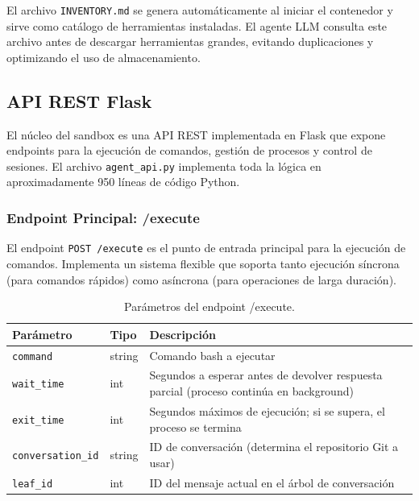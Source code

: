 El archivo \texttt{INVENTORY.md} se genera automáticamente al iniciar el contenedor y sirve como catálogo de herramientas instaladas. El agente LLM consulta este archivo antes de descargar herramientas grandes, evitando duplicaciones y optimizando el uso de almacenamiento.

\subsection{API REST Flask}

El núcleo del sandbox es una API REST implementada en Flask que expone endpoints para la ejecución de comandos, gestión de procesos y control de sesiones. El archivo \texttt{agent\_api.py} implementa toda la lógica en aproximadamente 950 líneas de código Python.

\subsubsection{Endpoint Principal: /execute}

El endpoint \texttt{POST /execute} es el punto de entrada principal para la ejecución de comandos. Implementa un sistema flexible que soporta tanto ejecución síncrona (para comandos rápidos) como asíncrona (para operaciones de larga duración).

\begin{table}[H]
\centering
\renewcommand{\arraystretch}{1.2}
\begin{tabular}{|l|l|p{6cm}|}
\hline
\rowcolor[gray]{0.85}
\textbf{Parámetro} & \textbf{Tipo} & \textbf{Descripción} \\
\hline
\texttt{command} & string & Comando bash a ejecutar \\
\hline
\texttt{wait\_time} & int & Segundos a esperar antes de devolver respuesta parcial (proceso continúa en background) \\
\hline
\texttt{exit\_time} & int & Segundos máximos de ejecución; si se supera, el proceso se termina \\
\hline
\texttt{conversation\_id} & string & ID de conversación (determina el repositorio Git a usar) \\
\hline
\texttt{leaf\_id} & int & ID del mensaje actual en el árbol de conversación \\
\hline
\end{tabular}
\caption{Parámetros del endpoint /execute.}
\label{tab:execute_params}
\end{table}


